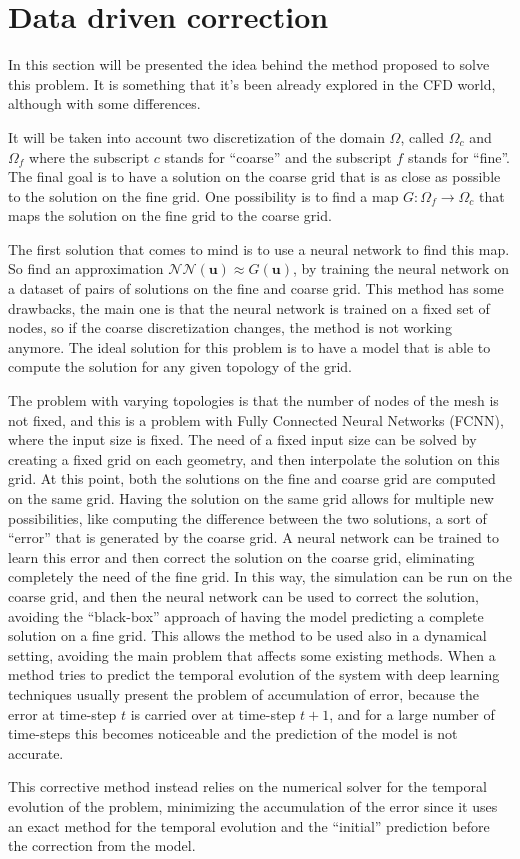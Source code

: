 \section{Data driven correction}
\label{sec:dd_correction}

In this section will be presented the idea behind the method proposed to solve this problem. It is something that it's been already explored in the CFD world, although with some differences. 

It will be taken into account two discretization of the domain \(\Omega\), called \(\Omega_c\) and \(\Omega_f\) where the subscript \(c\) stands for ``coarse'' and the subscript \(f\) stands for ``fine''. The final goal is to have a solution on the coarse grid that is as close as possible to the solution on the fine grid. One possibility is to find a map \(G: \Omega_f \rightarrow \Omega_c\) that maps the solution on the fine grid to the coarse grid. 

The first solution that comes to mind is to use a neural network to find this map. So find an approximation \(\mathcal{NN}(\bm{u}) \approx G(\bm{u})\), by training the neural network on a dataset of pairs of solutions on the fine and coarse grid. This method has some drawbacks, the main one is that the neural network is trained on a fixed set of nodes, so if the coarse discretization changes, the method is not working anymore. The ideal solution for this problem is to have a model that is able to compute the solution for any given topology of the grid.

The problem with varying topologies is that the number of nodes of the mesh is not fixed, and this is a problem with Fully Connected Neural Networks (FCNN), where the input size is fixed. The need of a fixed input size can be solved by creating a fixed grid on each geometry, and then interpolate the solution on this grid. At this point, both the solutions on the fine and coarse grid are computed on the same grid. Having the solution on the same grid allows for multiple new possibilities, like computing the difference between the two solutions, a sort of ``error'' that is generated by the coarse grid. A neural network can be trained to learn this error and then correct the solution on the coarse grid, eliminating completely the need of the fine grid. In this way, the simulation can be run on the coarse grid, and then the neural network can be used to correct the solution, avoiding the ``black-box'' approach of having the model predicting a complete solution on a fine grid. This allows the method to be used also in a dynamical setting, avoiding the main problem that affects some existing methods. When a method tries to predict the temporal evolution of the system with deep learning techniques usually present the problem of accumulation of error, because the error at time-step \(t\) is carried over at time-step \(t+1\), and for a large number of time-steps this becomes noticeable and the prediction of the model is not accurate. 

This corrective method instead relies on the numerical solver for the temporal evolution of the problem, minimizing the accumulation of the error since it uses an exact method for the temporal evolution and the ``initial'' prediction before the correction from the model.